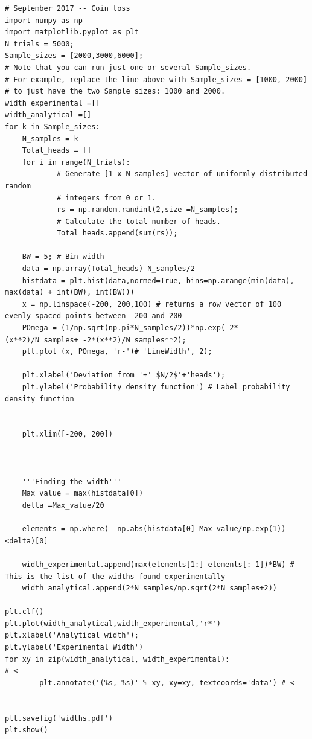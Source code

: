 \documentclass[letterpaper,12pt]{article}
\begin{document}
\begin{enumerate}
\begin{enumerate}
\begin{lstlisting}[style=myPythonstyle]
# September 2017 -- Coin toss
import numpy as np
import matplotlib.pyplot as plt
N_trials = 5000;
Sample_sizes = [2000,3000,6000];
# Note that you can run just one or several Sample_sizes.
# For example, replace the line above with Sample_sizes = [1000, 2000]
# to just have the two Sample_sizes: 1000 and 2000.
width_experimental =[]
width_analytical =[]
for k in Sample_sizes:
	N_samples = k
	Total_heads = []
	for i in range(N_trials):
			# Generate [1 x N_samples] vector of uniformly distributed random
			# integers from 0 or 1.
			rs = np.random.randint(2,size =N_samples);
			# Calculate the total number of heads.
			Total_heads.append(sum(rs));

	BW = 5; # Bin width
	data = np.array(Total_heads)-N_samples/2
	histdata = plt.hist(data,normed=True, bins=np.arange(min(data), max(data) + int(BW), int(BW)))
	x = np.linspace(-200, 200,100) # returns a row vector of 100 evenly spaced points between -200 and 200
	POmega = (1/np.sqrt(np.pi*N_samples/2))*np.exp(-2*(x**2)/N_samples+ -2*(x**2)/N_samples**2);
	plt.plot (x, POmega, 'r-')# 'LineWidth', 2);

	plt.xlabel('Deviation from '+' $N/2$'+'heads');
	plt.ylabel('Probability density function') # Label probability density function


	plt.xlim([-200, 200])



	'''Finding the width'''
	Max_value = max(histdata[0])
	delta =Max_value/20

	elements = np.where(  np.abs(histdata[0]-Max_value/np.exp(1)) <delta)[0]

	width_experimental.append(max(elements[1:]-elements[:-1])*BW) # This is the list of the widths found experimentally
	width_analytical.append(2*N_samples/np.sqrt(2*N_samples+2))

plt.clf()
plt.plot(width_analytical,width_experimental,'r*')
plt.xlabel('Analytical width');
plt.ylabel('Experimental Width')
for xy in zip(width_analytical, width_experimental):                                       # <--
		plt.annotate('(%s, %s)' % xy, xy=xy, textcoords='data') # <--


plt.savefig('widths.pdf')
plt.show()

\end{lstlisting}


\end{enumerate}
\end{enumerate}
\end{document}
